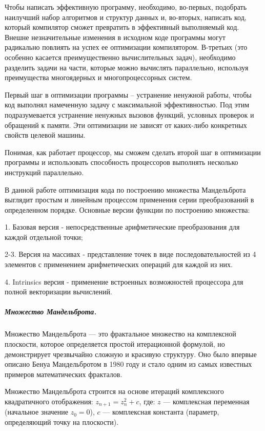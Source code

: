 \documentclass[12pt, letterpaper]{article}
\begin{document}
    Чтобы написать эффективную программу, необходимо, во-первых, подобрать наилучший набор алгоритмов и структур данных и, во-вторых, написать код, который компилятор сможет превратить в эффективный выполняемый код. Внешне незначительные изменения в исходном коде программы могут радикально повлиять на успех ее оптимизации компилятором. В-третьих (это особенно касается преимущественно вычислительных задач), необходимо разделить задачи на части, которые можно вычислять параллельно, используя преимущества многоядерных и многопроцессорных систем.

    Первый шаг в оптимизации программы – устранение ненужной работы, чтобы код выполнял намеченную задачу с максимальной эффективностью. Под этим подразумевается устранение ненужных вызовов функций, условных проверок и обращений к памяти. Эти оптимизации не зависят от каких-либо конкретных свойств целевой машины.

    Понимая, как работает процессор, мы сможем сделать второй шаг в оптимизации программы и использовать способность процессоров выполнять несколько инструкций параллельно. 

    В данной работе оптимизация кода по построению множества Мандельброта выглядит простым и линейным процессом применения серии преобразований в определенном порядке. Основные версии функции по построению множества:

    1. Базовая версия - непосредственные арифметические преобразования для каждой отдельной точки;
    
    2-3. Версия на массивах - представление точек в виде последовательностей из 4 элементов с применением арифметических операций для каждой из них.
    
    4. Intrinsics версия - применение встроенных возможностей процессора для полной векторизации вычислений.

    \subparagraph{Множество Мандельброта.} 
    Множество Мандельброта — это фрактальное множество на комплексной плоскости, которое определяется простой итерационной формулой, но демонстрирует чрезвычайно сложную и красивую структуру. Оно было впервые описано Бенуа Мандельбротом в 1980 году и стало одним из самых известных примеров математических фракталов.

    Множество Мандельброта строится на основе итераций комплексного квадратичного отображения: $z_{n+1} = z_{n}^2 + c$, где:
    $z$ — комплексная переменная (начальное значение $z_0 = 0$), $c$ — комплексная константа (параметр, определяющий точку на плоскости).
    
\end{document}
